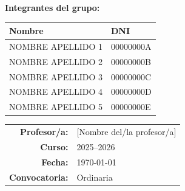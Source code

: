 \begin{titlepage}
  \vspace{1.5cm}

  {\large \textbf{Integrantes del grupo:}}\\[0.4cm]
  \begin{tabular}{ll}
    \toprule
    \textbf{Nombre} & \textbf{DNI} \\
    \midrule
    NOMBRE APELLIDO 1 & 00000000A \\
    NOMBRE APELLIDO 2 & 00000000B \\
    NOMBRE APELLIDO 3 & 00000000C \\
    NOMBRE APELLIDO 4 & 00000000D \\
    NOMBRE APELLIDO 5 & 00000000E \\ %
    \bottomrule
  \end{tabular}

  \vspace{1cm}

  \begin{tabular}{rl}
    \textbf{Profesor/a:}   & [Nombre del/la profesor/a] \\
    \textbf{Curso:}        & 2025--2026 \\
    \textbf{Fecha:}        & \today \\
    \textbf{Convocatoria:} & Ordinaria \\
  \end{tabular}

  \vfill
\end{titlepage}
